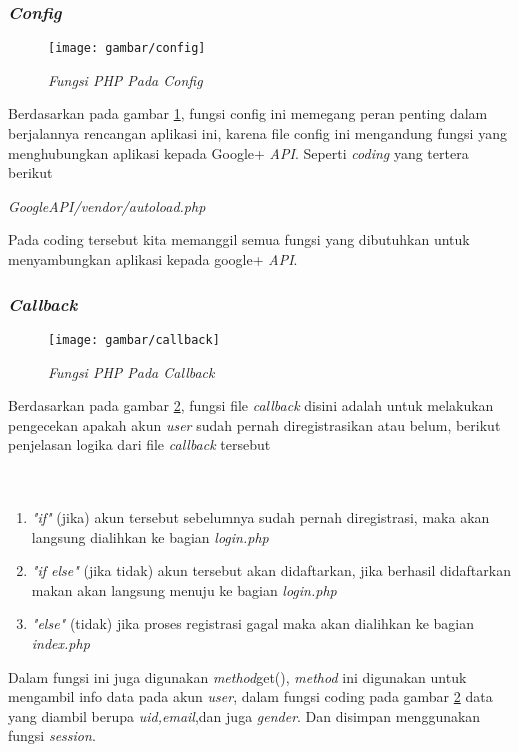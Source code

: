 \subsubsection{\textit{Config}}
\begin{figure}[!htbp]
    \centering
    \texttt{[image: gambar/config]}
    \caption{\textit{Fungsi PHP Pada Config}}
    \label{config}
\end{figure}
\par 
Berdasarkan pada gambar \ref{config}, fungsi config ini memegang peran penting dalam berjalannya rencangan aplikasi ini, karena file config ini mengandung fungsi yang menghubungkan aplikasi kepada Google+ \textit{API}. Seperti \textit{coding} yang tertera berikut
\par 
\textit{GoogleAPI/vendor/autoload.php}
\par 
Pada coding tersebut kita memanggil semua fungsi yang dibutuhkan untuk menyambungkan aplikasi kepada google+ \textit{API}.

\subsubsection{\textit{Callback}}
\begin{figure}[!htbp]
    \centering
    \texttt{[image: gambar/callback]}
    \caption{\textit{Fungsi PHP Pada Callback}}
    \label{callback}
\end{figure}
\par 
Berdasarkan pada gambar \ref{callback}, fungsi file \textit{callback} disini adalah untuk melakukan pengecekan apakah akun \textit{user} sudah pernah diregistrasikan atau belum, berikut penjelasan logika dari file \textit{callback} tersebut
\\
\\
\\
\begin{enumerate}
\item \textit{"if"} (jika) akun tersebut sebelumnya sudah pernah diregistrasi, maka akan langsung dialihkan ke bagian \textit{login.php}
\item \textit{"if else"} (jika tidak) akun tersebut akan didaftarkan, jika berhasil didaftarkan makan akan langsung menuju ke bagian \textit{login.php}
\item \textit{"else"} (tidak) jika proses registrasi gagal maka akan dialihkan ke bagian \textit{index.php}
\end{enumerate}
\par
Dalam fungsi ini juga digunakan \textit{method}get(), \textit{method} ini digunakan untuk mengambil info data pada akun \textit{user}, dalam fungsi coding pada gambar \ref{callback} data yang diambil berupa \textit{uid,email},dan juga \textit{gender}. Dan disimpan menggunakan fungsi \textit{session}.


